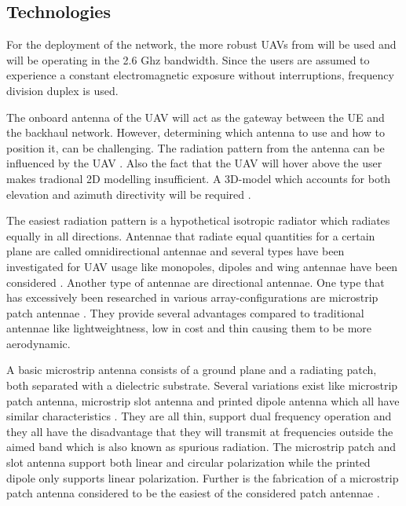 \documentclass[twocolumn]{phdsymp} %
\begin{document}
\subsection{Technologies}

For the deployment of the network, the more robust \gls{UAV}s from \cite{J2} will be used and will be operating in the 2.6 Ghz 
bandwidth. Since the users are assumed to experience a constant electromagnetic exposure without interruptions, frequency division duplex is used.

The onboard antenna of the \gls{UAV} will act as the gateway between the UE and the backhaul network.
However, determining which antenna to use and how to position it, can be challenging.
The radiation pattern from the antenna can be influenced by the \gls{UAV} \cite{A1}.
Also the fact that the \gls{UAV} will hover above the user makes tradional 2D modelling insufficient.
A 3D-model which accounts for both elevation and azimuth directivity 
will be required \cite{U12}.

The easiest radiation pattern is a hypothetical isotropic radiator which radiates equally in all directions.
Antennae that radiate equal quantities for a certain plane are called omnidirectional antennae \cite{U12} and several types 
have been investigated for \gls{UAV} usage like monopoles, dipoles and wing antennae 
have been considered \cite{A4,A10,A11,A12}.
Another type of antennae are directional antennae. One type 
that has excessively been researched in various array-configurations are microstrip patch antennae \cite{A5,A6,A8}.
They provide several advantages compared to traditional antennae \cite{J13_microstripadvantages, J14_antennadesign}
like lightweightness, low in cost and thin causing them to be more aerodynamic. 

A basic microstrip antenna consists of a ground plane and
a radiating patch, both separated with a dielectric substrate. 
Several variations exist like microstrip patch antenna, microstrip slot antenna and printed dipole antenna which
all have similar characteristics \cite{J13_microstripadvantages, J14_antennadesign}. They are all thin, support dual frequency operation and they all have the disadvantage that 
they 
will transmit at frequencies outside the aimed band which is also known as
spurious radiation. The microstrip patch and slot antenna support both linear
and circular polarization while the printed dipole only supports linear polarization. Further is the fabrication of a microstrip patch antenna considered to be the easiest 
of the considered patch antennae \cite{J13_microstripadvantages}. 
\end{document}
